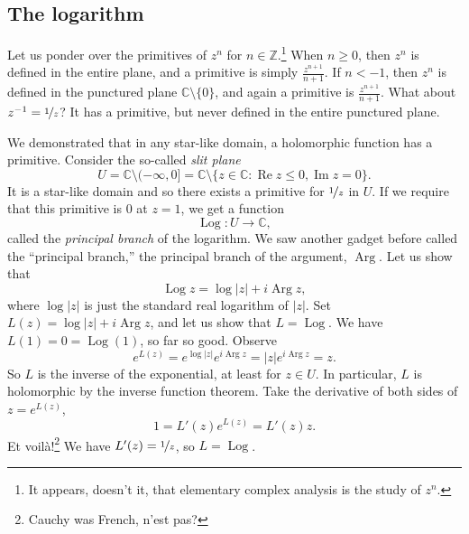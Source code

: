 \documentclass[12pt,openany]{book}
\renewcommand{\Re}{\operatorname{Re}}
\renewcommand{\Im}{\operatorname{Im}}
\newcommand{\Arg}{\operatorname{Arg}}
\newcommand{\Log}{\operatorname{Log}}
\newcommand{\sabs}[1]{\lvert {#1} \rvert}
\newcommand{\C}{{\mathbb{C}}}
\newcommand{\Z}{{\mathbb{Z}}}
\newcommand{\myindex}[1]{#1\index{#1}}
\newcommand{\myquote}[1]{``#1''}
\theoremstyle{plain}
\theoremstyle{remark}
\theoremstyle{definition}
\theoremstyle{exercise}
\theoremstyle{example}
\begin{document}
\subsection{The logarithm}

Let us ponder over the primitives of $z^n$ for $n \in \Z$.\footnote{It appears,
doesn't it, that elementary complex analysis is the study of $z^n$.}
When $n \geq 0$, 
then $z^n$ is defined in the entire plane, and a primitive is
simply $\frac{z^{n+1}}{n+1}$.  If $n < -1$, then $z^n$ is defined
in the punctured plane $\C \setminus \{0\}$, and again
a primitive is $\frac{z^{n+1}}{n+1}$.  What about $z^{-1} =
\nicefrac{1}{z}$?  It has a primitive, but never defined in
the entire punctured plane.

We demonstrated that in any star-like domain, a holomorphic function has a
primitive.  Consider the so-called \emph{\myindex{slit plane}}
\begin{equation*}
U = \C \setminus (-\infty,0] = \C \setminus \bigl\{ z \in \C : \Re z \leq 0 , \Im z = 0 \bigr\}.
\end{equation*}
It is a star-like domain and
so there exists a
primitive for $\nicefrac{1}{z}$ in $U$.
If we
require that this primitive is $0$ at $z=1$,
we get a function
%
\begin{equation*}
\operatorname{Log} \colon U \to \C ,
\end{equation*}
called the \emph{\myindex{principal branch}} of the logarithm.
We saw another gadget before called the \myquote{principal branch,} 
the principal branch of the argument, $\Arg$.  Let us show that
\begin{equation*}
\Log z = \log \sabs{z} + i \Arg z ,
\end{equation*}
where $\log \sabs{z}$ is just the standard real logarithm of $\sabs{z}$.
Set $L(z) = \log \sabs{z} + i \Arg z$, and let us show that $L = \Log$.
We have $L(1) = 0 = \Log(1)$, so far so good.
Observe
\begin{equation*}
e^{L(z)}
=
e^{\log \sabs{z}} e^{i \Arg z}
=
\sabs{z} e^{i \Arg z} = z .
\end{equation*}
So $L$ is the inverse of the exponential, at least for $z \in U$.
In particular, $L$ is holomorphic by the inverse function
theorem.
Take the derivative of both sides of $z = e^{L(z)}$,
\begin{equation*}
1 = L'(z) e^{L(z)} = L'(z) z .
\end{equation*}
Et voil\`a!\footnote{Cauchy was French, n'est pas?}
We have $L'(z) = \nicefrac{1}{z}$, so $L = \Log$.
\end{document}
